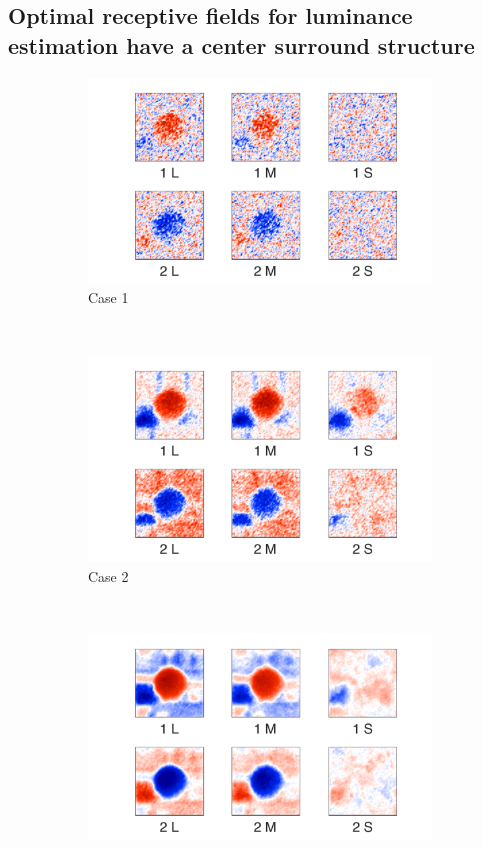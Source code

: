 \documentclass{jov}
\begin{document}
\subsection{Optimal receptive fields for luminance estimation have a center surround structure}
\begin{figure}
\centering
\begin{subfigure}{0.21 \textwidth}
	\includegraphics[width=\textwidth]{../Figures/Figure13/Figure13_a.pdf}
	\caption{Case 1}
	\label{fig:case1Filter}
    \end{subfigure}
    ~ ~ ~
    \begin{subfigure}{0.21 \textwidth}   
	\includegraphics[width=\textwidth]{../Figures/Figure13/Figure13_b.pdf}
	\caption{Case 2}
	\label{fig:case2Filter}
    \end{subfigure}
    ~ ~ ~
        \begin{subfigure}{0.21 \textwidth}
	\includegraphics[width=\textwidth]{../Figures/Figure13/Figure13_c.pdf}

\end{subfigure}
\end{figure}
\end{document}
